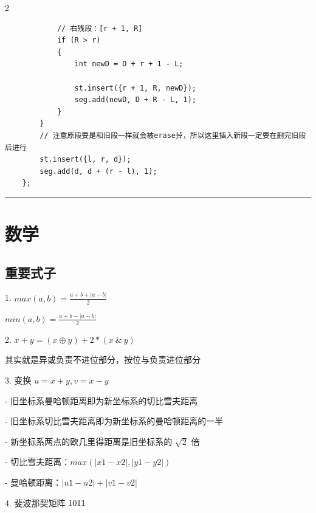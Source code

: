 \documentclass[10pt]{article}
\providecommand{\abs}[1]{\left|#1\right|}
\let\matrix\relax
\newcommand{\matrix}[1]{\begin{smallmatrix}#1\end{smallmatrix}}
\begin{document}
\begin{multicols*}{2}
\begin{verbatim}
            // 右残段：[r + 1, R]
            if (R > r)
            {
                int newD = D + r + 1 - L;

                st.insert({r + 1, R, newD});
                seg.add(newD, D + R - L, 1);
            }
        }
        // 注意原段要是和旧段一样就会被erase掉，所以这里插入新段一定要在删完旧段后进行
        st.insert({l, r, d});
        seg.add(d, d + (r - l), 1);
    };
\end{verbatim}




\noindent\rule{\linewidth}{0.4pt}\par




\section{数学}


\subsection{重要式子}


1. $max(a,b) = \frac{a + b + \abs{a - b}}{2}$ \par

$min(a,b) = \frac{a + b - \abs{a - b}}{2}$ \par

2. $x + y  = (x\oplus y )+ 2*(x \ \&\ y)$ \par

其实就是异或负责不进位部分，按位与负责进位部分 \par

3. 变换 $ u = x + y,v = x - y$ \par

- 旧坐标系曼哈顿距离即为新坐标系的切比雪夫距离 \par

- 旧坐标系切比雪夫距离即为新坐标系的曼哈顿距离的一半 \par

- 新坐标系两点的欧几里得距离是旧坐标系的 $\sqrt2$ 倍 \par

- 切比雪夫距离：$max(|x1 - x2|, |y1 - y2|)$ \par

- 曼哈顿距离：$|u1 - u2| + |v1 - v2|$ \par

4. 斐波那契矩阵  $\matrix{10\\11}$ \par


\end{multicols*}
\end{document}
